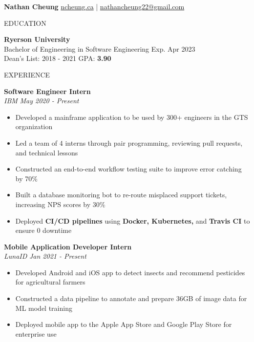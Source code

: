 \documentclass[letterpaper,11pt,oneside]{article}
\newcommand{\createHeading}[1]{
    \vspace{1.25em}
    \hline
    \vspace{-1.5ex}
    \begin{center}
        #1
    \end{center}
    \vspace{-1.5ex}
    \hline
    \vspace{1.25em}
}
\begin{document}

\noindent \huge{\textbf{Nathan Cheung}} \hfill \normalsize{\href{https://ncheung.ca}{ncheung.ca} | \href{mailto:nathancheung22@gmail.com}{nathancheung22@gmail.com}}




\createHeading{EDUCATION}
\begin{addmargin}[.6em]{.6em}
    \textbf{Ryerson University} \\
    Bachelor of Engineering in Software Engineering \hfill Exp. Apr 2023 \\
    Dean's List: 2018 - 2021 \hfill GPA: \textbf{3.90}
\end{addmargin}

\createHeading{EXPERIENCE}
\begin{addmargin}[.6em]{.6em}
    \textbf{Software Engineer Intern} \\
    \textit{IBM} \hfill \textit{May 2020 - Present}
    \begin{itemize}
        \item Developed a mainframe application to be used by 300+ engineers in the GTS organization
        \item Led a team of 4 interns through pair programming, reviewing pull requests, and technical lessons
        \item Constructed an end-to-end workflow testing suite to improve error catching by 70\%
        \item Built a database monitoring bot to re-route misplaced support tickets, increasing NPS scores by 30\%
        \item Deployed \textbf{CI/CD pipelines} using \textbf{Docker, Kubernetes,} and \textbf{Travis CI} to ensure 0 downtime
    \end{itemize}
    \vspace{1.25em}
    \textbf{Mobile Application Developer Intern} \\
    \textit{LunaID} \hfill \textit{Jan 2021 - Present}
    \begin{itemize}
        \item Developed Android and iOS app to detect insects and recommend pesticides for agricultural farmers
        \item Constructed a data pipeline to annotate and prepare 36GB of image data for ML model training
        \item Deployed mobile app to the Apple App Store and Google Play Store for enterprise use
    \end{itemize}
    \vspace{0.5em}
\end{addmargin}
\end{document}
